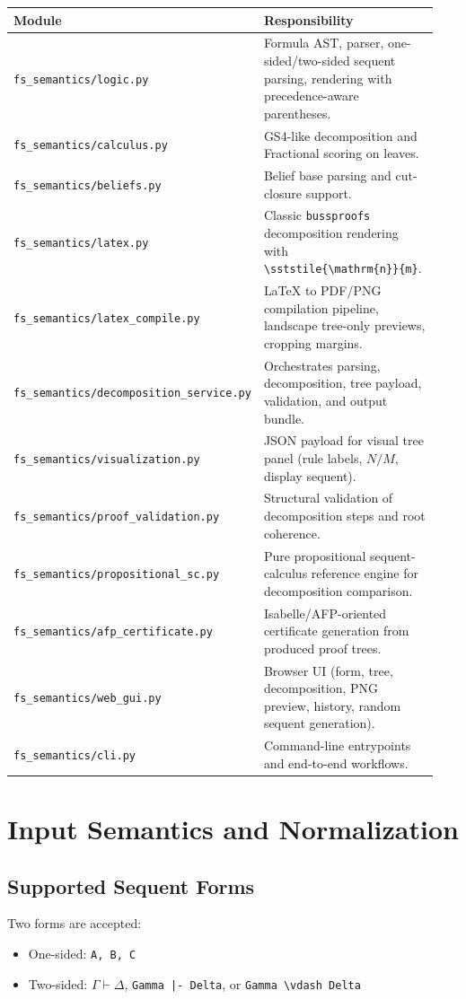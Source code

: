 \documentclass[11pt,a4paper]{article}
\begin{document}
\begin{longtable}{>{\raggedright\arraybackslash}p{0.34\linewidth} >{\raggedright\arraybackslash}p{0.60\linewidth}}
\textbf{Module} & \textbf{Responsibility} \\
\hline
\texttt{fs\_semantics/logic.py} & Formula AST, parser, one-sided/two-sided sequent parsing, rendering with precedence-aware parentheses. \\
\texttt{fs\_semantics/calculus.py} & GS4-like decomposition and Fractional scoring on leaves. \\
\texttt{fs\_semantics/beliefs.py} & Belief base parsing and cut-closure support. \\
\texttt{fs\_semantics/latex.py} & Classic \texttt{bussproofs} decomposition rendering with \texttt{\textbackslash sststile\{\textbackslash mathrm\{n\}\}\{m\}}. \\
\texttt{fs\_semantics/latex\_compile.py} & LaTeX to PDF/PNG compilation pipeline, landscape tree-only previews, cropping margins. \\
\texttt{fs\_semantics/decomposition\_service.py} & Orchestrates parsing, decomposition, tree payload, validation, and output bundle. \\
\texttt{fs\_semantics/visualization.py} & JSON payload for visual tree panel (rule labels, $N/M$, display sequent). \\
\texttt{fs\_semantics/proof\_validation.py} & Structural validation of decomposition steps and root coherence. \\
\texttt{fs\_semantics/propositional\_sc.py} & Pure propositional sequent-calculus reference engine for decomposition comparison. \\
\texttt{fs\_semantics/afp\_certificate.py} & Isabelle/AFP-oriented certificate generation from produced proof trees. \\
\texttt{fs\_semantics/web\_gui.py} & Browser UI (form, tree, decomposition, PNG preview, history, random sequent generation). \\
\texttt{fs\_semantics/cli.py} & Command-line entrypoints and end-to-end workflows. \\
\end{longtable}

\section{Input Semantics and Normalization}
\subsection{Supported Sequent Forms}
Two forms are accepted:
\begin{itemize}[leftmargin=1.5em]
  \item One-sided: \texttt{A, B, C}
  \item Two-sided: \(\Gamma \vdash \Delta\), \texttt{Gamma |- Delta}, or \texttt{Gamma \textbackslash vdash Delta}
\end{itemize}
\end{document}
